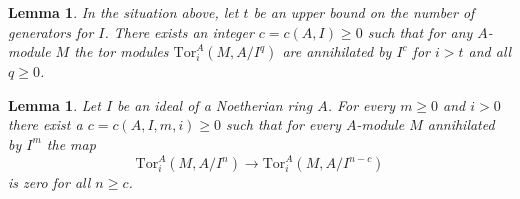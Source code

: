 \documentclass[10pt,a4paper]{amsart}
\theoremstyle{plain}
\newtheorem{lemma}[subsection]{Lemma}
\theoremstyle{definition}
\theoremstyle{remark}
\numberwithin{equation}{subsection}
\begin{document}
\begin{lemma}
\label{lemma-annihilates-tors}
In the situation above, let $t$ be an upper bound on the number of
generators for $I$. There exists an integer $c = c(A, I) \geq 0$
such that for any $A$-module $M$ the tor modules
$\text{Tor}_i^A(M, A/I^q)$ are annihilated by $I^c$ for $i > t$
and all $q \geq 0$.
\end{lemma}

\begin{lemma}
\label{lemma-maps-zero-fixed-torsion}
Let $I$ be an ideal of a Noetherian ring $A$. For every $m \geq 0$
and $i > 0$ there exist a $c = c(A, I, m, i) \geq 0$ such that
for every $A$-module $M$ annihilated by $I^m$ the map
$$
\text{Tor}^A_i(M, A/I^n) \to \text{Tor}^A_i(M, A/I^{n - c})
$$
is zero for all $n \geq c$.
\end{lemma}
\end{document}
